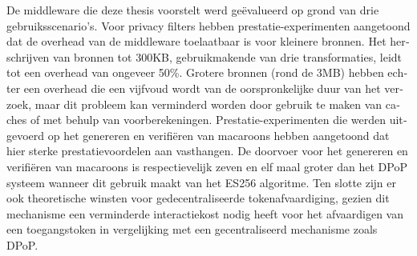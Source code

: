 \begin{abstract*}
\begin{otherlanguage}{dutch}
  De middleware die deze thesis voorstelt werd ge{\"e}valueerd op grond van drie gebruiksscenario's. Voor privacy filters hebben prestatie-experimenten aangetoond dat de overhead van de middleware toelaatbaar is voor kleinere bronnen. Het herschrijven van bronnen tot 300KB, gebruikmakende van drie transformaties, leidt tot een overhead van ongeveer 50\%. Grotere bronnen (rond de 3MB) hebben echter een overhead die een vijfvoud wordt van de oorspronkelijke duur van het verzoek, maar dit probleem kan verminderd worden door gebruik te maken van caches of met behulp van voorberekeningen. Prestatie-experimenten die werden uitgevoerd op het genereren en verifi{\"e}ren van macaroons hebben aangetoond dat hier sterke prestatievoordelen aan vasthangen. De doorvoer voor het genereren en verifi{\"e}ren van macaroons is respectievelijk zeven en elf maal groter dan het \acrshort{DPoP} systeem wanneer dit gebruik maakt van het ES256 algoritme. Ten slotte zijn er ook theoretische winsten voor gedecentraliseerde tokenafvaardiging, gezien dit mechanisme een verminderde interactiekost nodig heeft voor het afvaardigen van een toegangstoken in vergelijking met een gecentraliseerd mechanisme zoals \acrshort{DPoP}.
  \end{otherlanguage}
\end{abstract*}